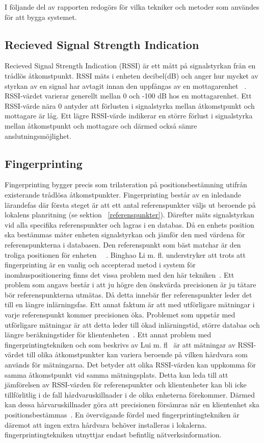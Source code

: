 \documentclass[a4paper,12pt]{article}
\begin{document}
 I följande del av rapporten redogörs för vilka tekniker och metoder som användes för att bygga systemet.

 \subsection{Recieved Signal Strength Indication}\label{RSSI}
 Recieved Signal Strength Indication (RSSI) är ett mått på signalstyrkan från en trådlös åtkomstpunkt. RSSI mäts i enheten decibel(dB) och anger hur mycket av styrkan av en signal har avtagit innan den uppfångas av en mottagarenhet ~\cite{RSSI_expl}. RSSI-värdet varierar generellt mellan 0 och -100 dB hos en mottagarenhet. Ett RSSI-värde nära 0 antyder att förlusten i signalstyrka mellan åtkomstpunkt och mottagare är låg. Ett lägre RSSI-värde indikerar en större förlust i signalstyrka mellan åtkomstpunkt och mottagare och därmed också sämre anslutningsmöjlighet.

 \subsection{Fingerprinting}\label{fingerprinting}
 Fingerprinting bygger precis som trilateration på positionsbestämning utifrån existerande trådlösa åtkomstpunkter. Fingerprinting består av en inledande lärandefas där första steget är att ett antal referenspunkter väljs ut beroende på lokalens planritning (se sektion ~\ref{referenspunkter}). Därefter mäts signalstyrkan vid alla specifika referenspunkter och lagras i en databas.
 Då en enhets position ska bestämmas mäter enheten signalstyrkan och jämför den med värdena för referenspunkterna i databasen. Den referenspunkt som bäst matchar är den troliga positionen för enheten ~\cite{IP1}~\cite{jun2018low}.
 Binghao Li m. fl. understryker att trots att fingerprinting är en vanlig och accepterad metod i system för inomhuspositionering finns det vissa problem med den här tekniken~\cite{IP1}.
 Ett problem som angavs består i att ju högre den önskvärda precisionen är ju tätare bör referenspunkterna utmätas. Då detta innebär fler referenspunkter leder det till en längre inlärningsfas. Ett annat faktum är att med utförligare mätningar i varje referenspunkt kommer precisionen öka. Problemet som uppstår med utförligare mätningar är att detta leder till ökad inlärningstid, större databas och längre beräkningstider för klientenheten~\cite{IP1}. Ett annat problem med fingerprintingtekniken och som beskrivs av Lui m. fl~\cite{problem_with_RSSI} är att mätningar av RSSI-värdet till olika åtkomstpunkter kan variera beroende på vilken hårdvara som används för mätningarna. Det betyder att olika RSSI-värden kan uppkomma för samma åtkomstpunkt vid samma mätningsplats. Detta kan leda till att jämförelsen av RSSI-värden för referenspunkter och klientenheter kan bli icke tillförlitlig i de fall hårdvaruskillnader i de olika enheterna förekommer. Därmed kan dessa hårvaruskillnader göra att precisionen försämras när en klientenhet ska positionsbestämmas~\cite{problem_with_RSSI}. En övervägande fördel med fingerprintingtekniken är däremot att ingen extra hårdvara behöver installeras i lokalerna. fingerprintingtekniken utnyttjar endast befintlig nätverksinformation.
\end{document}
